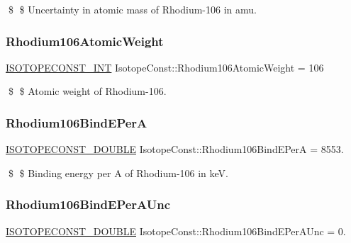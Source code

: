 \$ \$ Uncertainty in atomic mass of Rhodium-\/106 in amu. \mbox{\label{group___isotope_const-_rhodium-_rh106_gacb00e0e79fe176884307a68be82c4dd3}} 
\subsubsection{\texorpdfstring{Rhodium106\+Atomic\+Weight}{Rhodium106AtomicWeight}}
{\footnotesize\ttfamily \mbox{\hyperlink{group___isotope_const-_macros_ga5f18360b3e99483a35c32d789e62621c}{I\+S\+O\+T\+O\+P\+E\+C\+O\+N\+S\+T\+\_\+\+I\+NT}} Isotope\+Const\+::\+Rhodium106\+Atomic\+Weight = 106}

\$ \$ Atomic weight of Rhodium-\/106. \mbox{\label{group___isotope_const-_rhodium-_rh106_ga54f87196706dc00fa346a4fe139347bb}} 
\subsubsection{\texorpdfstring{Rhodium106\+Bind\+E\+PerA}{Rhodium106BindEPerA}}
{\footnotesize\ttfamily \mbox{\hyperlink{group___isotope_const-_macros_ga8f45a7272ce02c0b4c65c44636ed719a}{I\+S\+O\+T\+O\+P\+E\+C\+O\+N\+S\+T\+\_\+\+D\+O\+U\+B\+LE}} Isotope\+Const\+::\+Rhodium106\+Bind\+E\+PerA = 8553.}

\$ \$ Binding energy per A of Rhodium-\/106 in keV. \mbox{\label{group___isotope_const-_rhodium-_rh106_ga1bda4dffeb4ca9fb22c2a156d04a2000}} 
\subsubsection{\texorpdfstring{Rhodium106\+Bind\+E\+Per\+A\+Unc}{Rhodium106BindEPerAUnc}}
{\footnotesize\ttfamily \mbox{\hyperlink{group___isotope_const-_macros_ga8f45a7272ce02c0b4c65c44636ed719a}{I\+S\+O\+T\+O\+P\+E\+C\+O\+N\+S\+T\+\_\+\+D\+O\+U\+B\+LE}} Isotope\+Const\+::\+Rhodium106\+Bind\+E\+Per\+A\+Unc = 0.}

